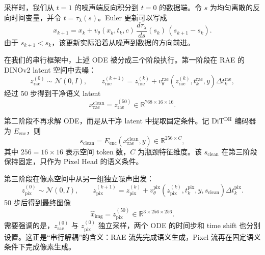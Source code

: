 \documentclass[11pt]{article}
\begin{document}
采样时，我们从 $t=1$ 的噪声端反向积分到 $t=0$ 的数据端。令 $s$ 为均匀离散的反向时间变量，并令 $t=\tau_\lambda(s)$。Euler 更新可以写成
\begin{equation}
    x_{k+1}
    = x_k + v_\theta(x_k,t_k,c)\,
      \frac{d\tau_\lambda}{ds}(s_k)\,(s_{k+1}-s_k).
\end{equation}
由于 $s_{k+1}<s_k$，该更新实际沿着从噪声到数据的方向前进。

在我们的串行框架中，上述 ODE 被分成三个阶段执行。第一阶段在 RAE 的 DINOv2 latent 空间中去噪：
\begin{equation}
    z^{(0)}_{\mathrm{rae}}\sim\mathcal N(0,I),\qquad
    z^{(k+1)}_{\mathrm{rae}}
    = z^{(k)}_{\mathrm{rae}}
      + v^{\mathrm{rae}}_\theta
        \left(z^{(k)}_{\mathrm{rae}}, t^{\mathrm{rae}}_k, y\right)
        \Delta t^{\mathrm{rae}}_k ,
\end{equation}
经过 50 步得到干净语义 latent
\begin{equation}
    x_{\mathrm{rae}}^{\mathrm{clean}} = z_{\mathrm{rae}}^{(50)}
    \in \mathbb R^{768\times 16\times 16}.
\end{equation}

第二阶段不再求解 ODE，而是从干净 latent 中提取固定条件。记 DiT$^{\mathrm{DH}}$ 编码器为 $E_{\mathrm{enc}}$，则
\begin{equation}
    s_{\mathrm{clean}}
    = E_{\mathrm{enc}}\left(x_{\mathrm{rae}}^{\mathrm{clean}}, y\right)
    \in \mathbb R^{256\times C},
\end{equation}
其中 $256=16\times16$ 表示空间 token 数，$C$ 为瓶颈特征维度。该 $s_{\mathrm{clean}}$ 在第三阶段保持固定，只作为 Pixel Head 的语义条件。

第三阶段在像素空间中从另一组独立噪声出发：
\begin{equation}
    z^{(0)}_{\mathrm{pix}}\sim\mathcal N(0,I),\qquad
    z^{(k+1)}_{\mathrm{pix}}
    = z^{(k)}_{\mathrm{pix}}
      + v^{\mathrm{pix}}_\theta
        \left(z^{(k)}_{\mathrm{pix}}, t^{\mathrm{pix}}_k, y, s_{\mathrm{clean}}\right)
        \Delta t^{\mathrm{pix}}_k .
\end{equation}
50 步后得到最终图像
\begin{equation}
    \hat{x}_{\mathrm{img}} = z_{\mathrm{pix}}^{(50)}
    \in \mathbb R^{3\times256\times256}.
\end{equation}
需要强调的是，$z_{\mathrm{rae}}^{(0)}$ 与 $z_{\mathrm{pix}}^{(0)}$ 独立采样，两个 ODE 的时间步和 time shift 也分别设置。这正是“串行解耦”的含义：RAE 流先完成语义生成，Pixel 流再在固定语义条件下完成像素生成。
\end{document}
